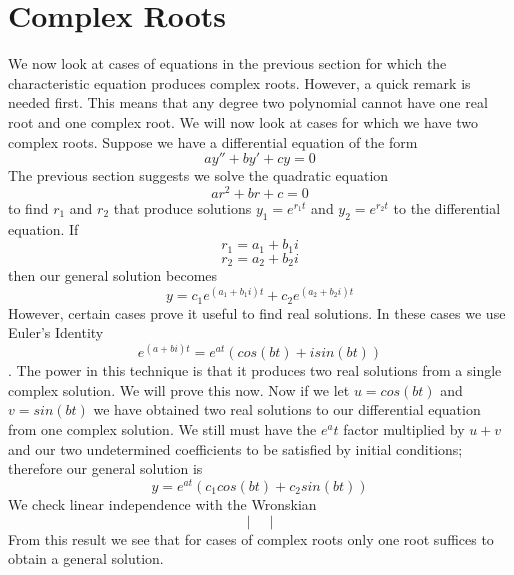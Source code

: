 \section{Complex Roots}
\noindent We now look at cases of equations in the previous section for which the characteristic equation produces complex roots. However, a quick remark is needed first. 
This means that any degree two polynomial cannot have one real root and one complex root. We will now look at cases for which we have two complex roots. 
Suppose we have a differential equation of the form
\[ay'' + by' + cy = 0\]
The previous section suggests we solve the quadratic equation
\[ar^2 + br+ c = 0\] 
to find $r_1$ and $r_2$ that produce solutions $y_1 = e^{r_1t}$ and $y_2 = e^{r_2t}$ to the differential equation. If
\[r_1 = a_1 + b_1i\]
\[r_2 = a_2 + b_2i\]
then our general solution becomes
\[y = c_1e^{(a_1+b_1i)t} + c_2e^{(a_2+b_2i)t}\]
However, certain cases prove it useful to find real solutions. 
In these cases we use Euler's Identity 
\[e^{(a+bi)t} = e^{at}(cos(bt) + isin(bt))\].
The power in this technique is that it produces two real solutions from a single complex solution. We will prove this now.
Now if we let $u = cos(bt)$ and $v = sin(bt)$ we have obtained two real solutions to our differential equation from one complex solution. We still must have the $e^at$ factor multiplied by $u+v$ and our two undetermined coefficients to be satisfied by initial conditions; therefore our general solution is
\[y = e^{at}(c_1cos(bt) + c_2sin(bt))\]
We check linear independence with the Wronskian
\[\begin{vmatrix}
    
\end{vmatrix}\]
From this result we see that for cases of complex roots only one root suffices to obtain a general solution. 

